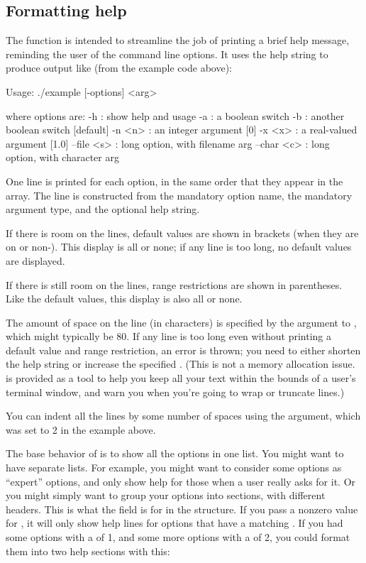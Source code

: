 \subsection{Formatting help}


The  function is intended to streamline
the job of printing a brief help message, reminding the user of the
command line options. It uses the help string to produce output like
(from the example code above):

\begin{cchunk}
Usage: ./example [-options] <arg>

  where options are:
  -h         : show help and usage
  -a         : a boolean switch
  -b         : another boolean switch  [default]
  -n <n>     : an integer argument  [0]
  -x <x>     : a real-valued argument  [1.0]
  --file <s> : long option, with filename arg
  --char <c> : long option, with character arg
\end{cchunk}

One line is printed for each option, in the same order that they
appear in the  array. The line is constructed from
the mandatory option name, the mandatory argument type, and the
optional help string.

If there is room on the lines, default values are shown in brackets
(when they are on or non-). This display is all or none;
if any line is too long, no default values are displayed.

If there is still room on the lines, range restrictions are shown in
parentheses. Like the default values, this display is also all or
none.

The amount of space on the line (in characters) is specified by the
 argument to , which
might typically be 80. If any line is too long even without printing a
default value and range restriction, an error is thrown; you need to
either shorten the help string or increase the specified
. (This is not a memory allocation
issue.  is provided as a tool to help you keep all
your text within the bounds of a user's terminal window, and warn you
when you're going to wrap or truncate lines.)

You can indent all the lines by some number of spaces using the
 argument, which was set to 2 in the example above.


The base behavior of  is to show all
the options in one list. You might want to have separate lists. For
example, you might want to consider some options as ``expert''
options, and only show help for those when a user really asks for it.
Or you might simply want to group your options into sections, with
different headers. This is what the  field is for
in the  structure. If you pass
 a nonzero value for ,
it will only show help lines for options that have a matching
. If you had some options with a
 of 1, and some more options with a 
 of 2, you could format them into two help sections
with this:

